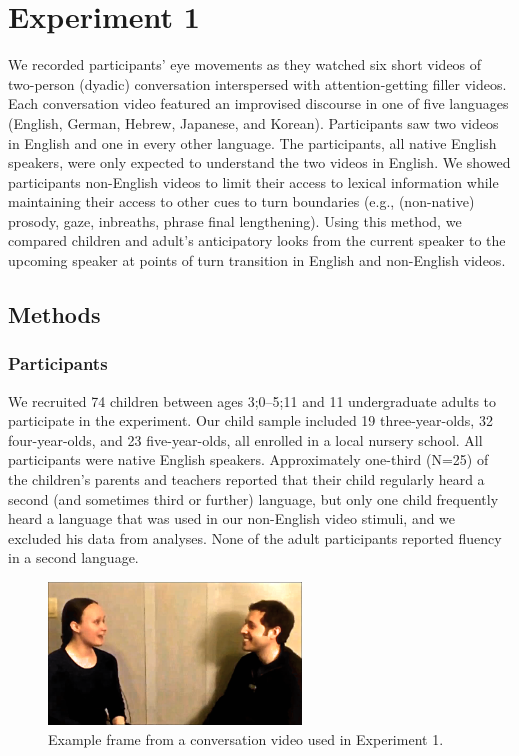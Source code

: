 \documentclass[authoryear, 12pt]{elsarticle}
\begin{document}
\section{Experiment 1}
\label{sec:exp1}

We recorded participants' eye movements as they watched six short videos of two-person (dyadic) conversation interspersed with attention-getting filler videos. Each conversation video featured an improvised discourse in one of five languages (English, German, Hebrew, Japanese, and Korean). Participants saw two videos in English and one in every other language. The participants, all native English speakers, were only expected to understand the two videos in English. We showed participants non-English videos to limit their access to lexical information while maintaining their access to other cues to turn boundaries (e.g., (non-native) prosody, gaze, inbreaths, phrase final lengthening). Using this method, we compared children and adult's anticipatory looks from the current speaker to the upcoming speaker at points of turn transition in English and non-English videos.

\subsection{Methods}
\label{sec:methods1}

\subsubsection{Participants}

We recruited 74 children between ages 3;0--5;11 and 11 undergraduate adults to participate in the experiment. Our child sample included 19 three-year-olds, 32 four-year-olds, and 23 five-year-olds, all enrolled in a local nursery school. All participants were native English speakers. Approximately one-third (N=25) of the children's parents and teachers reported that their child regularly heard a second (and sometimes third or further) language, but only one child frequently heard a language that was used in our non-English video stimuli, and we excluded his data from analyses. None of the adult participants reported fluency in a second language.

\begin{figure}[t]
\begin{center}
\includegraphics[width=0.6\textwidth]{figures/FIG-FL-stim.png}
\end{center}
\caption{Example frame from a conversation video used in Experiment 1.} 
\label{fig:speakers}
\end{figure}
\end{document}
